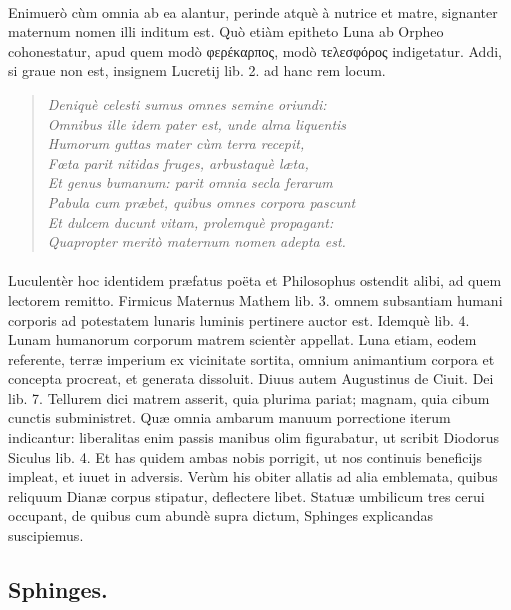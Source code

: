\documentclass[a4paper, 11pt, oneside, polutonikogreek, latin]{article}
\begin{document}
\paragraph{}
Enimuerò cùm omnia ab ea alantur, perinde atquè à nutrice et matre, signanter maternum nomen illi inditum est. Quò etiàm epitheto Luna ab Orpheo cohonestatur, apud quem modò φερέκαρπος, modò τελεσφόρος indigetatur. Addi, si graue non est, insignem Lucretij lib. 2. ad hanc rem locum.
\begin{quote}
\emph{Deniquè celesti sumus omnes semine oriundi:}\\
\emph{Omnibus ille idem pater est, unde alma liquentis}\\
\emph{Humorum guttas mater cùm terra recepit,}\\
\emph{Fœta parit nitidas fruges, arbustaquè læta,}\\
\emph{Et genus bumanum: parit omnia secla ferarum}\\
\emph{Pabula cum præbet, quibus omnes corpora pascunt}\\
\emph{Et dulcem ducunt vitam, prolemquè propagant:}\\
\emph{Quapropter meritò maternum nomen adepta est.}\\
\end{quote}
\paragraph{}
Luculentèr hoc identidem præfatus poëta et Philosophus ostendit alibi, ad quem lectorem remitto. Firmicus Maternus Mathem lib. 3. omnem subsantiam humani corporis ad potestatem lunaris luminis pertinere auctor est. Idemquè lib. 4. Lunam humanorum corporum matrem scientèr appellat. Luna etiam, eodem referente, terræ imperium ex vicinitate sortita, omnium animantium corpora et concepta procreat, et generata dissoluit. Diuus autem Augustinus de Ciuit. Dei lib. 7. Tellurem dici matrem asserit, quia plurima pariat; magnam, quia cibum cunctis subministret. Quæ omnia ambarum manuum porrectione iterum indicantur: liberalitas enim passis manibus olim figurabatur, ut scribit Diodorus Siculus lib. 4. Et has quidem ambas nobis porrigit, ut nos continuis beneficijs impleat, et iuuet in adversis. Verùm his obiter allatis ad alia emblemata, quibus reliquum Dianæ corpus stipatur, deflectere libet. Statuæ umbilicum tres cerui occupant, de quibus cum abundè supra dictum, Sphinges explicandas suscipiemus.
\clearpage
\subsection{Sphinges.}
\end{document}
